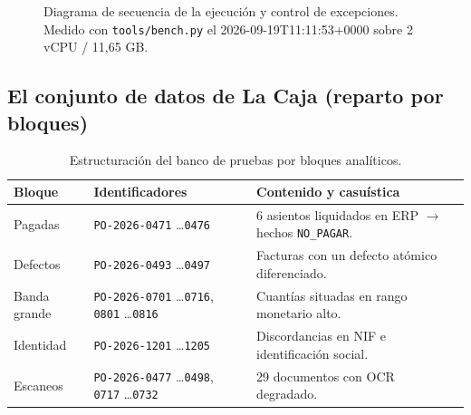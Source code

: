 \documentclass[11pt,a4paper]{article}
\begin{document}
\begin{figure}[p]
{%
}
\caption{Diagrama de secuencia de la ejecución y control de excepciones. Medido con \texttt{tools/bench.py} el 2026-09-19T11:11:53+0000 sobre 2 vCPU / 11,65 GB.}
\end{figure}
\clearpage

\subsection{El conjunto de datos de La Caja (reparto por bloques)}

\begin{table}[htbp]
\centering
\begin{tabular}{p{} p{} p{}}
\toprule
\textbf{Bloque} & \textbf{Identificadores} & \textbf{Contenido y casuística} \\
\midrule
Pagadas & \texttt{PO-2026-0471} \dots \texttt{0476} & 6 asientos liquidados en ERP $\rightarrow$ hechos \texttt{NO\_PAGAR}. \\
Defectos & \texttt{PO-2026-0493} \dots \texttt{0497} & Facturas con un defecto atómico diferenciado. \\
Banda grande & \texttt{PO-2026-0701} \dots \texttt{0716}, \texttt{0801} \dots \texttt{0816} & Cuantías situadas en rango monetario alto. \\
Identidad & \texttt{PO-2026-1201} \dots \texttt{1205} & Discordancias en NIF e identificación social. \\
Escaneos & \texttt{PO-2026-0477} \dots \texttt{0498}, \texttt{0717} \dots \texttt{0732} & 29 documentos con OCR degradado. \\
\bottomrule
\end{tabular}
\caption{Estructuración del banco de pruebas por bloques analíticos.}
\end{table}
\end{document}
